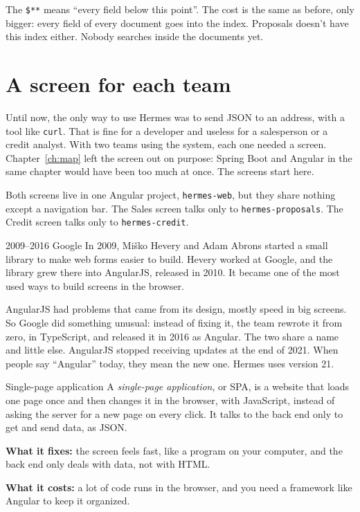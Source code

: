 The \texttt{\$**} means ``every field below this point''. The cost is the
same as before, only bigger: every field of every document goes into the
index. Proposals doesn't have this index either. Nobody searches inside the
documents yet.

\section{A screen for each team}

Until now, the only way to use Hermes was to send JSON to an address, with
a tool like \texttt{curl}. That is fine for a developer and useless for a
salesperson or a credit analyst. With two teams using the system, each one
needed a screen. Chapter~\ref{ch:map} left the screen out on purpose: Spring
Boot and Angular in the same chapter would have been too much at once. The
screens start here.

Both screens live in one Angular project, \texttt{hermes-web}, but they share
nothing except a navigation bar. The Sales screen talks only to
\texttt{hermes-proposals}. The Credit screen talks only to
\texttt{hermes-credit}.


\begin{history}{2009--2016 \textperiodcentered{} Google}
In 2009, Miško Hevery and Adam Abrons started a small library to make web
forms easier to build. Hevery worked at Google, and the library grew there
into AngularJS, released in 2010. It became one of the most used ways to
build screens in the browser.

AngularJS had problems that came from its design, mostly speed in big
screens. So Google did something unusual: instead of fixing it, the team
rewrote it from zero, in TypeScript, and released it in 2016 as Angular. The
two share a name and little else. AngularJS stopped receiving updates at the
end of 2021. When people say ``Angular'' today, they mean the new one. Hermes
uses version 21.
\end{history}

\begin{concept}{Single-page application}
A \emph{single-page application}, or SPA, is a website that loads one page
once and then changes it in the browser, with JavaScript, instead of asking
the server for a new page on every click. It talks to the back end only to
get and send data, as JSON.

\textbf{What it fixes:} the screen feels fast, like a program on your
computer, and the back end only deals with data, not with HTML.

\textbf{What it costs:} a lot of code runs in the browser, and you need a
framework like Angular to keep it organized.
\end{concept}

